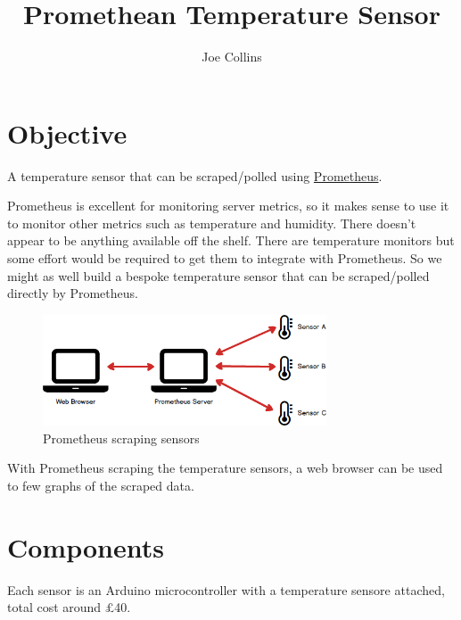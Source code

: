 \documentclass[a4paper, 11pt]{article}
\title{Promethean Temperature Sensor}
\author{Joe Collins}
\begin{document}
\maketitle
\tableofcontents
\clearpage

\section{Objective}

A temperature sensor that can be scraped/polled using \href{https://prometheus.io/}{Prometheus}.

Prometheus is excellent for monitoring server metrics,
so it makes sense to use it to monitor other metrics such as temperature and humidity.
There doesn't appear to be anything available off the shelf.
There are temperature monitors but some effort would be required to get 
them to integrate with Prometheus.
So we might as well build a bespoke temperature sensor
that can be scraped/polled directly by Prometheus.

\begin{figure}[H]
  \centering
  \includegraphics[width=0.75\textwidth]{prometheus.png}
  \caption{Prometheus scraping sensors}
\end{figure}

With Prometheus scraping the temperature sensors,
a web browser can be used to few graphs of the scraped data.

\section{Components}

Each sensor is an Arduino microcontroller with a temperature sensore attached,
total cost around \pounds 40.
\end{document}
